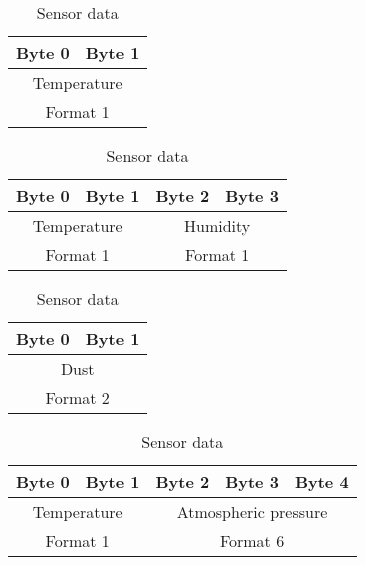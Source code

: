 \begin{table}[H]
    \centering
    {
    \begin{tabular}{|c c|}
        \hline
        \textbf{Byte 0} & \textbf{Byte 1}\\
        \hline
        \hline
        \multicolumn{2}{|c|}{Temperature}\\
        \multicolumn{2}{|c|}{Format 1}\\
        \hline
    \end{tabular}
    }
    \caption{Sensor data}
    \label{table:sensor2}
\end{table}

\begin{table}[H]
    \centering
    {
    \begin{tabular}{|c c c c|}
        \hline
        \textbf{Byte 0} & \textbf{Byte 1} & \textbf{Byte 2} & \textbf{Byte 3}\\
        \hline
        \hline
        \multicolumn{2}{|c|}{Temperature} & \multicolumn{2}{|c|}{Humidity}\\
        \multicolumn{2}{|c|}{Format 1} & \multicolumn{2}{|c|}{Format 1}\\
        \hline
    \end{tabular}
    }
    \caption{Sensor data}
    \label{table:sensor3}
\end{table}

\begin{table}[H]
    \centering
    {
    \begin{tabular}{|c c|}
        \hline
        \textbf{Byte 0} & \textbf{Byte 1}\\
        \hline
        \hline
        \multicolumn{2}{|c|}{Dust}\\
        \multicolumn{2}{|c|}{Format 2}\\
        \hline
    \end{tabular}
    }
    \caption{Sensor data}
    \label{table:sensor4}
\end{table}

\begin{table}[H]
    \centering
    {
    \begin{tabular}{|c c c c c|}
        \hline
        \textbf{Byte 0} & \textbf{Byte 1} & \textbf{Byte 2} & \textbf{Byte 3} & \textbf{Byte 4}\\
        \hline
        \hline
        \multicolumn{2}{|c|}{Temperature} & \multicolumn{3}{|c|}{Atmospheric pressure}\\
        \multicolumn{2}{|c|}{Format 1} & \multicolumn{3}{|c|}{Format 6}\\
        \hline
    \end{tabular}
    }
    \caption{Sensor data}
    \label{table:sensor5}
\end{table}

